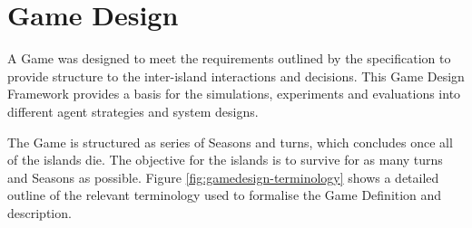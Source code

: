 \chapter{Game Design}

A Game was designed to meet the requirements outlined by the specification to provide structure to the inter-island interactions and decisions. This Game Design Framework provides a basis for the simulations, experiments and evaluations into different agent strategies and system designs.

The Game is structured as series of Seasons and turns, which concludes once all of the islands die. The objective for the islands is to survive for as many turns and Seasons as possible. Figure \ref{fig:gamedesign-terminology} shows a detailed outline of the relevant terminology used to formalise the Game Definition and description.

